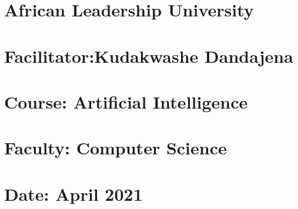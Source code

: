 \documentclass[12pt]{article}
\renewcommand{\_}{\kern-1.5pt\textunderscore\kern-1.5pt}
\begin{document}
\vspace{\baselineskip}
\chapter{African Leadership University}
\chapter{Facilitator:Kudakwashe Dandajena}
\chapter{Course: Artificial Intelligence}
\chapter{Faculty: Computer Science}
\chapter{Date: April 2021}

\vspace{\baselineskip}

\vspace{\baselineskip}
\end{document}
